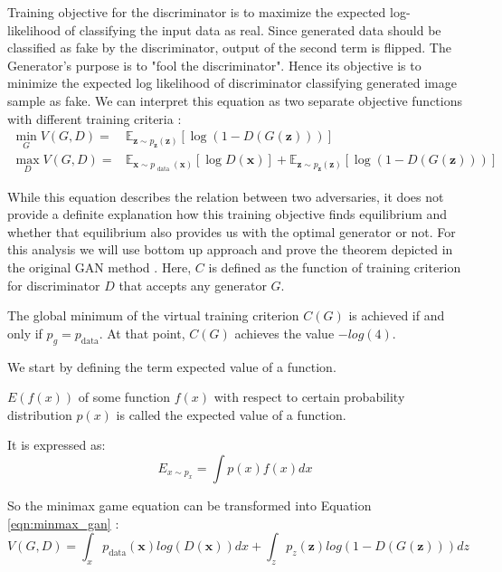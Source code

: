 Training objective for the discriminator is to maximize the expected log-likelihood of
classifying the input data as real.
Since generated data should be classified as fake by the discriminator, output of the second
term is flipped. The Generator's purpose is to "fool the discriminator". Hence its objective
is to minimize the expected log likelihood of discriminator classifying generated image sample as
fake. We can interpret this equation as two separate objective functions with different training
criteria :
\begin{align}
    \min _{G} V(G, D)=& \mathbb{E}_{\boldsymbol{z} \sim p_{\boldsymbol{z}}(\boldsymbol{z})}[\log (1-D(G(\boldsymbol{z})))] \\[5pt]
    \max _{D} V(G, D)=& \mathbb{E}_{\boldsymbol{x} \sim p_{\text { data }}(\boldsymbol{x})}[\log D(\boldsymbol{x})]+\mathbb{E}_{\boldsymbol{z} \sim p_{\boldsymbol{z}}(\boldsymbol{z})}[\log (1-D(G(\boldsymbol{z})))]
\end{align}

While this equation describes the relation between two adversaries, it does not provide a
definite explanation how this training objective finds equilibrium and whether that equilibrium also
provides us with the optimal generator or not. For this analysis we will use bottom up approach and
prove the theorem depicted in the original GAN method \cite{Goodfellow:2014:GAN:2969033.2969125}. Here,
$C$ is defined as the function of training criterion for discriminator $D$ that accepts any generator $G$.

\begin{theorem}
\label{thr:gan}
The global minimum of the virtual training criterion $C(G)$ is achieved if and only if $p_g = p_{\text{data}}$.
At that point, $C(G)$ achieves the value $-log(4)$.
\end{theorem} 
We start by defining the term expected value of a function. 

\begin{definition}
    $E(f(x))$ of some function $f(x)$ with respect to  certain probability distribution
$p(x)$ is called the expected value of a function.  
\end{definition}

It is expressed as:
\begin{equation}
    \label{eqn:ev}
    E_{x \sim p_x} = \int p(x) f(x) dx
\end{equation}

So the minimax game equation can be transformed into Equation \ref{eqn:minmax_gan} : 
\begin{equation}
    \label{eqn:minmax_gan}
    V( G, D) = \int_x p_{\text{data}}(\boldsymbol{x}) log(D(\boldsymbol{x})) dx + \int_z p_z(\boldsymbol{z}) log(1 - D(G(\boldsymbol{z}))) dz
\end{equation}

